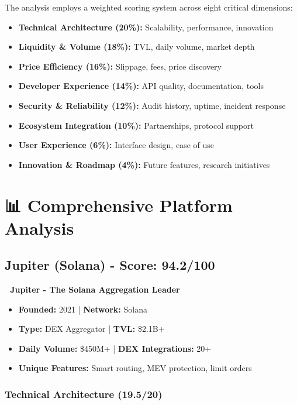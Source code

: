 \documentclass[11pt,a4paper]{article}
\begin{document}
The analysis employs a weighted scoring system across eight critical dimensions:

\begin{itemize}
    \item \textbf{Technical Architecture (20\%):} Scalability, performance, innovation
    \item \textbf{Liquidity \& Volume (18\%):} TVL, daily volume, market depth
    \item \textbf{Price Efficiency (16\%):} Slippage, fees, price discovery
    \item \textbf{Developer Experience (14\%):} API quality, documentation, tools
    \item \textbf{Security \& Reliability (12\%):} Audit history, uptime, incident response
    \item \textbf{Ecosystem Integration (10\%):} Partnerships, protocol support
    \item \textbf{User Experience (6\%):} Interface design, ease of use
    \item \textbf{Innovation \& Roadmap (4\%):} Future features, research initiatives
\end{itemize}

\section{📊 Comprehensive Platform Analysis}

\subsection{Jupiter (Solana) - Score: 94.2/100}

\begin{tcolorbox}[colback=jupiterBlue!10,colframe=jupiterBlue]
\textbf{🚀 Jupiter - The Solana Aggregation Leader}
\begin{itemize}
    \item \textbf{Founded:} 2021 | \textbf{Network:} Solana
    \item \textbf{Type:} DEX Aggregator | \textbf{TVL:} \$2.1B+
    \item \textbf{Daily Volume:} \$450M+ | \textbf{DEX Integrations:} 20+
    \item \textbf{Unique Features:} Smart routing, MEV protection, limit orders
\end{itemize}
\end{tcolorbox}

\subsubsection{Technical Architecture (19.5/20)}
\end{document}

